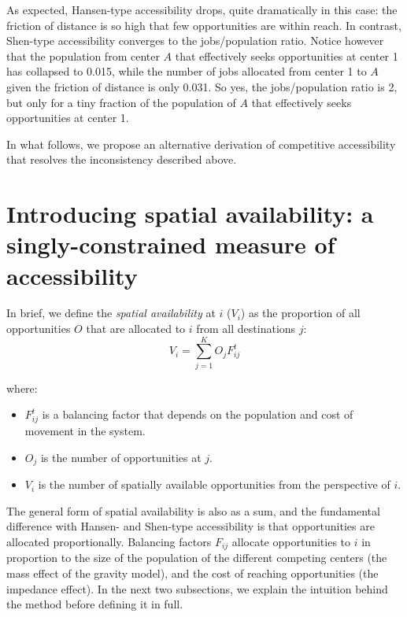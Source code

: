 \documentclass[]{elsarticle} %
\providecommand{\tightlist}{%
  \setlength{\itemsep}{0pt}\setlength{\parskip}{0pt}}
\begin{document}
\begin{table}[ht]
\end{table}
 

As expected, Hansen-type accessibility drops, quite dramatically in this
case: the friction of distance is so high that few opportunities are
within reach. In contrast, Shen-type accessibility converges to the
jobs/population ratio. Notice however that the population from center
\(A\) that effectively seeks opportunities at center 1 has collapsed to
0.015, while the number of jobs allocated from center 1 to \(A\) given
the friction of distance is only 0.031. So yes, the jobs/population
ratio is 2, but only for a tiny fraction of the population of \(A\) that
effectively seeks opportunities at center 1.

In what follows, we propose an alternative derivation of competitive
accessibility that resolves the inconsistency described above.

\hypertarget{introducing-spatial-availability-a-singly-constrained-measure-of-accessibility}{%
\section{Introducing spatial availability: a singly-constrained measure
of
accessibility}\label{introducing-spatial-availability-a-singly-constrained-measure-of-accessibility}}

In brief, we define the \emph{spatial availability} at \(i\) (\(V_{i}\))
as the proportion of all opportunities \(O\) that are allocated to \(i\)
from all destinations \(j\): \[
V_i = \sum_{j=1}^KO_jF^t_{ij}
\]

\noindent where:

\begin{itemize}
\tightlist
\item
  \(F^t_{ij}\) is a balancing factor that depends on the population and
  cost of movement in the system.
\item
  \(O_j\) is the number of opportunities at \(j\).
\item
  \(V_i\) is the number of spatially available opportunities from the
  perspective of \(i\).
\end{itemize}

The general form of spatial availability is also as a sum, and the
fundamental difference with Hansen- and Shen-type accessibility is that
opportunities are allocated proportionally. Balancing factors \(F_{ij}\)
allocate opportunities to \(i\) in proportion to the size of the
population of the different competing centers (the mass effect of the
gravity model), and the cost of reaching opportunities (the impedance
effect). In the next two subsections, we explain the intuition behind
the method before defining it in full.
\end{document}
